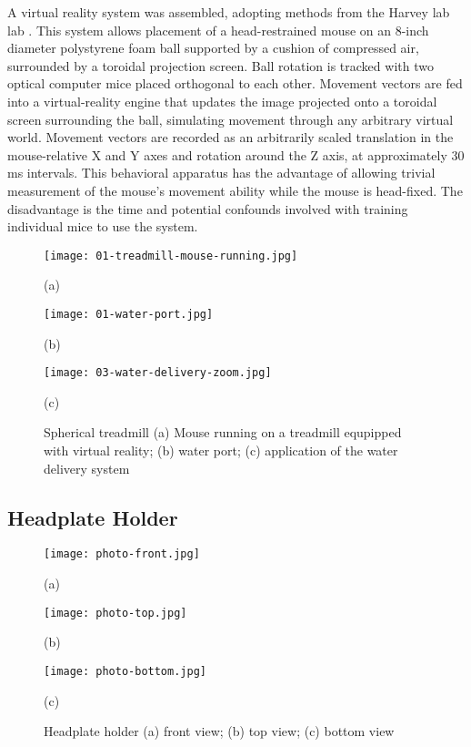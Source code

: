 \documentclass[../main.tex]{subfiles}
\begin{document}
A virtual reality system was assembled, adopting methods from the Harvey lab lab \cite{harvey_intracellular_2009}.
This system allows placement of a head-restrained mouse on an 8-inch diameter polystyrene foam ball supported by a cushion of compressed air, surrounded by a toroidal projection screen.
Ball rotation is tracked with two optical computer mice placed orthogonal to each other.
Movement vectors are fed into a virtual-reality engine that updates the image projected onto a toroidal screen surrounding the ball, simulating movement through any arbitrary virtual world.
Movement vectors are recorded as an arbitrarily scaled translation in the mouse-relative X and Y axes and rotation around the Z axis, at approximately 30 ms intervals.
This behavioral apparatus has the advantage of allowing trivial measurement of the mouse's movement ability while the mouse is head-fixed.
The disadvantage is the time and potential confounds involved with training individual mice to use the system.

\begin{figure}[htb]
	\begin{minipage}[t]{0.32\linewidth}\centering
		\texttt{[image: 01-treadmill-mouse-running.jpg]}
		\centerline{(a)}
	\end{minipage}
	\hfill
	\begin{minipage}[t]{0.15\linewidth}\centering
		\texttt{[image: 01-water-port.jpg]}
		\centerline{(b)}
	\end{minipage}
	\begin{minipage}[t]{0.45\linewidth}\centering
		\texttt{[image: 03-water-delivery-zoom.jpg]}
		\centerline{(c)}
	\end{minipage}
	\caption{
		Spherical treadmill (a) Mouse running on a treadmill equpipped with virtual reality;
		(b) water port; (c) application of the water delivery system }
	\label{fig:Spherical treadmill}
\end{figure}

\subsection{
	Headplate Holder}\label{sec:headplate-holder}

\begin{figure}[htb]
	\begin{minipage}[t]{0.32\linewidth}\centering \texttt{[image: photo-front.jpg]} \centerline{(a)}
	\end{minipage}
	\hfill
	\begin{minipage}[t]{0.32\linewidth}\centering \texttt{[image: photo-top.jpg]} \centerline{(b)}
	\end{minipage}
	\begin{minipage}[t]{0.32\linewidth}\centering \texttt{[image: photo-bottom.jpg]} \centerline{(c)}
	\end{minipage}
	\caption{Headplate holder (a) front view;
		(b) top view; (c) bottom view}
	\label{fig:Spherical treadmill}
\end{figure}
\end{document}
